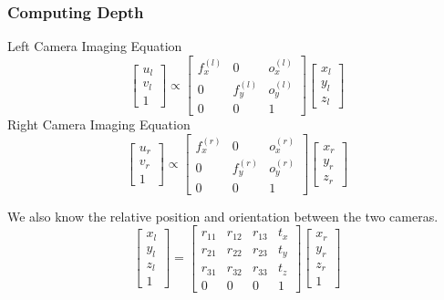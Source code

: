\begin{frame}
    \frametitle{Computing Depth}
    Left Camera Imaging Equation
    $$
    \begin{bmatrix} u_l \\ v_l \\ 1 \end{bmatrix} \propto
    \begin{bmatrix}
        f_x^{(l)} & 0 & o_x^{(l)} \\
        0 & f_y^{(l)} & o_y^{(l)} \\
        0 & 0 & 1
    \end{bmatrix}
    \begin{bmatrix} x_l \\ y_l \\ z_l \end{bmatrix}
    $$
    Right Camera Imaging Equation
    $$
    \begin{bmatrix} u_r \\ v_r \\ 1 \end{bmatrix} \propto
    \begin{bmatrix}
        f_x^{(r)} & 0 & o_x^{(r)} \\
        0 & f_y^{(r)} & o_y^{(r)} \\
        0 & 0 & 1
    \end{bmatrix}
    \begin{bmatrix} x_r \\ y_r \\ z_r \end{bmatrix}
    $$

    We also know the relative position and orientation between the two cameras.
    $$
    \begin{bmatrix} x_l \\ y_l \\ z_l \\ 1 \end{bmatrix} =
    \begin{bmatrix}
        r_{11} & r_{12} & r_{13} & t_x \\
        r_{21} & r_{22} & r_{23} & t_y \\
        r_{31} & r_{32} & r_{33} & t_z \\
        0 & 0 & 0 & 1
    \end{bmatrix}
    \begin{bmatrix} x_r \\ y_r \\ z_r \\ 1 \end{bmatrix}
    $$
\end{frame}

